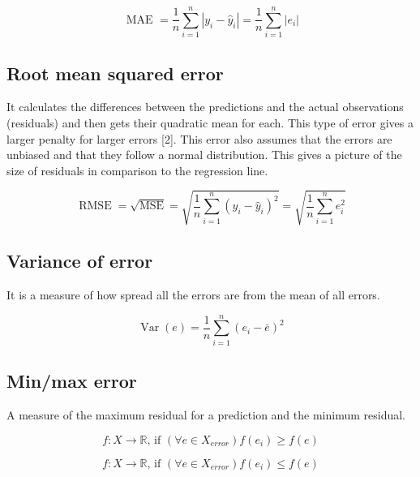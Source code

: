 \documentclass[
  letterpaper,
  DIV=11,
  numbers=noendperiod]{scrreprt}
\begin{document}
\[
\text { MAE }=\frac{1}{n}\sum_{i=1}^n\left|y_i-\hat{y}_i\right|=\frac{1}{n}\sum_{i=1}^n\left|e_i\right|
\]

\hypertarget{root-mean-squared-error}{%
\subsection{Root mean squared error}\label{root-mean-squared-error}}

It calculates the differences between the predictions and the actual
observations (residuals) and then gets their quadratic mean for each.
This type of error gives a larger penalty for larger errors {[}2{]}.
This error also assumes that the errors are unbiased and that they
follow a normal distribution. This gives a picture of the size of
residuals in comparison to the regression line.

\[
\operatorname{RMSE}=\sqrt{\operatorname{MSE}}=\sqrt{\frac{1}{n}\sum_{i=1}^n (y_i-\hat{y}_i)^2}=\sqrt{\frac{1}{n}\sum_{i=1}^n e_i^2}
\]

\hypertarget{variance-of-error}{%
\subsection{Variance of error}\label{variance-of-error}}

It is a measure of how spread all the errors are from the mean of all
errors.

\[
\operatorname{Var}(e)=\frac{1}{n}\sum_{i=1}^n(e_i-\bar{e})^2
\]

\hypertarget{minmax-error}{%
\subsection{Min/max error}\label{minmax-error}}

A measure of the maximum residual for a prediction and the minimum
residual.

\[
f: X \rightarrow \mathbb{R} \text {, if }(\forall e \in X_{error}) f\left(e_i\right) \geq f(e)
\]

\[
f: X \rightarrow \mathbb{R} \text {, if }(\forall e \in X_{error}) f\left(e_i\right) \leq f(e)
\]
\end{document}
